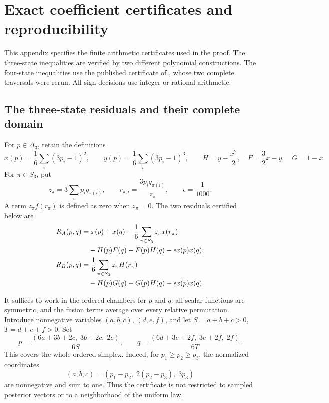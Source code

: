 \section{Exact coefficient certificates and reproducibility}
\label{app:exact-certificates}

This appendix specifies the finite arithmetic certificates used in the proof.
The three-state inequalities are verified by two different polynomial
constructions.  The four-state inequalities use the published certificate
of \cite{OpenAI4}, whose two complete traversals were rerun.
All sign decisions use integer or rational arithmetic.

\subsection{The three-state residuals and their complete domain}

For \(p\in\Delta_3\), retain the definitions
\[
 x(p)=\frac16\sum_i(3p_i-1)^2,\qquad
 y(p)=\frac16\sum_i(3p_i-1)^3,\qquad
 H=y-\frac{x^2}{2},\quad F=\frac32x-y,\quad G=1-x.
\]
For \(\pi\in S_3\), put
\[
 z_\pi=3\sum_i p_iq_{\pi(i)},\qquad
 r_{\pi,i}=\frac{3p_iq_{\pi(i)}}{z_\pi},\qquad
 \epsilon=\frac1{1000}.
\]
A term \(z_\pi f(r_\pi)\) is defined as zero when \(z_\pi=0\).
The two residuals certified below are
\begin{align}
 R_A(p,q)
 &=x(p)+x(q)-\frac16\sum_{\pi\in S_3}z_\pi x(r_\pi)\notag\\
 &\quad-H(p)F(q)-F(p)H(q)-\epsilon x(p)x(q), \label{eq:app-RA}\\
 R_B(p,q)
 &=\frac16\sum_{\pi\in S_3}z_\pi H(r_\pi)\notag\\
 &\quad-H(p)G(q)-G(p)H(q)-\epsilon x(p)x(q). \label{eq:app-RB}
\end{align}

It suffices to work in the ordered chambers for \(p\) and \(q\):
all scalar functions are symmetric, and the fusion terms average over
every relative permutation.  Introduce nonnegative variables
\((a,b,c)\), \((d,e,f)\), and let \(S=a+b+c>0\), \(T=d+e+f>0\).  Set
\[
 p=\frac{(6a+3b+2c,\;3b+2c,\;2c)}{6S},
 \qquad
 q=\frac{(6d+3e+2f,\;3e+2f,\;2f)}{6T}.
\]
This covers the whole ordered simplex.  Indeed, for
\(p_1\ge p_2\ge p_3\), the normalized coordinates
\[
 (a,b,c)=(p_1-p_2,\;2(p_2-p_3),\;3p_3)
\]
are nonnegative and sum to one.  Thus the certificate is not restricted
to sampled posterior vectors or to a neighborhood of the uniform law.

